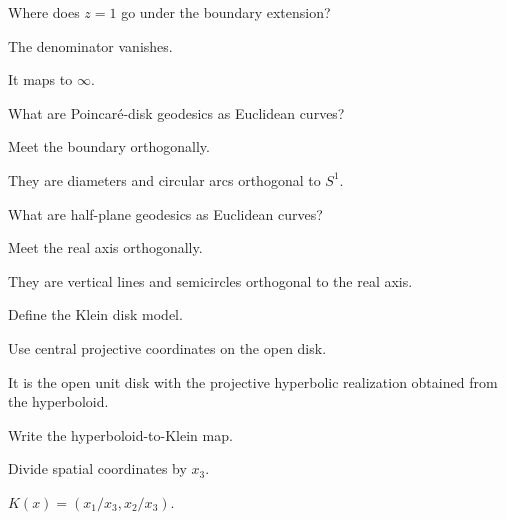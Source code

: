 \begin{exercise}\label{exr:vii31-13}
Where does \(z=1\) go under the boundary extension?
\end{exercise}
\begin{hint}
The denominator vanishes.
\end{hint}
\begin{solution}
It maps to \(\infty\).
\end{solution}

\begin{exercise}\label{exr:vii31-14}
What are Poincaré-disk geodesics as Euclidean curves?
\end{exercise}
\begin{hint}
Meet the boundary orthogonally.
\end{hint}
\begin{solution}
They are diameters and circular arcs orthogonal to \(S^1\).
\end{solution}

\begin{exercise}\label{exr:vii31-15}
What are half-plane geodesics as Euclidean curves?
\end{exercise}
\begin{hint}
Meet the real axis orthogonally.
\end{hint}
\begin{solution}
They are vertical lines and semicircles orthogonal to the real axis.
\end{solution}

\begin{exercise}\label{exr:vii31-16}
Define the Klein disk model.
\end{exercise}
\begin{hint}
Use central projective coordinates on the open disk.
\end{hint}
\begin{solution}
It is the open unit disk with the projective hyperbolic realization obtained from the hyperboloid.
\end{solution}

\begin{exercise}\label{exr:vii31-17}
Write the hyperboloid-to-Klein map.
\end{exercise}
\begin{hint}
Divide spatial coordinates by \(x_3\).
\end{hint}
\begin{solution}
\(K(x)=(x_1/x_3,x_2/x_3)\).
\end{solution}


